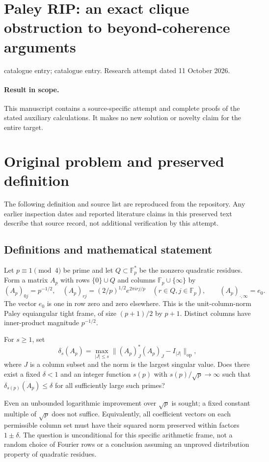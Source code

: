 \documentclass[11pt]{article}
\begin{document}
\section*{Paley RIP: an exact clique obstruction to beyond-coherence arguments}
\noindent catalogue entry; catalogue entry. Research attempt dated 11 October 2026.
\paragraph{Result in scope.}This manuscript contains a source-specific attempt and complete proofs of the stated auxiliary calculations. It makes no new solution or novelty claim for the entire target.
\section{Original problem and preserved definition}
The following definition and source list are reproduced from the repository. Any earlier inspection dates and reported literature claims in this preserved text describe that source record, not additional verification by this attempt.
\subsection{Definitions and mathematical statement}
Let $p\equiv1\pmod4$ be prime and let $Q\subset\mathbb F_p^*$ be
the nonzero quadratic residues. Form a matrix $A_p$ with rows
$\{0\}\cup Q$ and columns $\mathbb F_p\cup\{\infty\}$ by
\[
 (A_p)_{0j}=p^{-1/2},\quad
 (A_p)_{rj}=(2/p)^{1/2}e^{2\pi i rj/p}\quad(r\in Q,j\in\mathbb F_p),
 \qquad (A_p)_{\cdot,\infty}=e_0.
\]
The vector $e_0$ is one in row zero and zero elsewhere. This is the
unit-column-norm Paley equiangular tight frame, of size
$(p+1)/2$ by $p+1$. Distinct columns have inner-product magnitude
$p^{-1/2}$.

For $s\ge1$, set
\[
 \delta_s(A_p)=\max_{|J|\le s}
                 \|(A_p)_J^*(A_p)_J-I_{|J|}\|_{\mathrm{op}},
\]
where $J$ is a column subset and the norm is the largest singular
value. Does there exist a fixed $\delta<1$ and an integer function
$s(p)$ with $s(p)/\sqrt p\to\infty$ such that
$\delta_{s(p)}(A_p)\le\delta$ for all sufficiently large such primes?

Even an unbounded logarithmic improvement over $\sqrt p$ is sought;
a fixed constant multiple of $\sqrt p$ does not suffice. Equivalently,
all coefficient vectors on each permissible column set must have their
squared norm preserved within factors $1\pm\delta$. The question is
unconditional for this specific arithmetic frame, not a random choice
of Fourier rows or a conclusion assuming an unproved distribution
property of quadratic residues.
\end{document}
